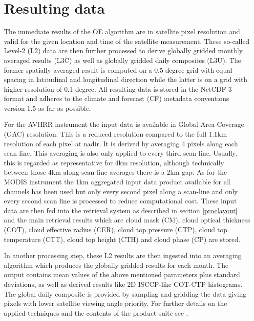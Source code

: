 \documentclass[amt]{style/copernicus}
\begin{document}
\section{Resulting data}\label{resultingdata}

The immediate results of the OE algorithm are in satellite pixel resolution and valid for the given location and time of the satellite measurement. These so-called Level-2 (L2) data are then further processed to derive globally gridded monthly averaged results (L3C) as well as globally gridded daily composites (L3U). The former spatially averaged result is computed on a 0.5 degree grid with equal spacing in latitudinal and longitudinal direction while the latter is on a grid with higher resolution of 0.1 degree. All resulting data is stored in the NetCDF-3 format and adheres to the climate and forecast (CF) metadata conventions version 1.5 as far as possible. 


For the AVHRR instrument the input data is available in Global Area Coverage (GAC) resolution. This is a reduced resolution compared to the full 1.1km resolution of each pixel at nadir. It is derived by averaging 4 pixels along each scan line. This averaging is also only applied to every third scan line. Usually, this is regarded as representative for 4km resolution, although technically between those 4km along-scan-line-averages there is a 2km gap. As for the MODIS instrument the 1km aggregated input data product available for all channels has been used but only every second pixel along a scan-line and only every second scan line is processed to reduce computational cost. These input data are then fed into the retrieval system as described in section \ref{proclayout} and the main retrieval results which are cloud mask (CM), cloud optical thickness (COT), cloud effective radius (CER), cloud top pressure (CTP), cloud top temperature (CTT),  cloud top height (CTH) and cloud phase (CP) are stored.%


In another processing step, these L2 results are then ingested into an
averaging algorithm which produces the globally gridded results for each
month. The output contains mean values of the above mentioned parameters plus
standard deviations, as well as derived results like 2D ISCCP-like COT-CTP
histograms. The global daily composite is provided by sampling and gridding
the data giving pixels with lower satellite viewing angle priority. For further
details on the applied techniques and the contents of the product suite see
\citet{ORAC_ATBD, Cloud_CCI_ATBD}.
\end{document}
